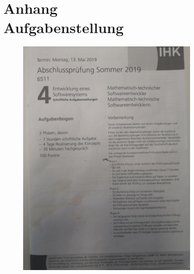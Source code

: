 \addtocounter{chapter}{1}
\chapter*{Anhang \thechapter\\[1.2cm] Aufgabenstellung}
\label{Aufgabenstellung}


\begin{figure}[htb]
    \centering
    \includegraphics[width=0.8\textwidth,]{./aufgabenstellung/1.jpg}
\end{figure}


